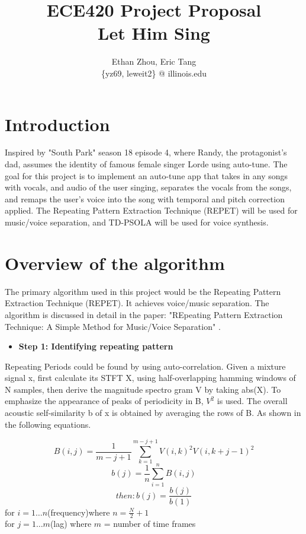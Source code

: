 \documentclass[journal,onecolumn, draftclsnofoot, 12pt]{IEEEtran}
\title{ECE420 Project Proposal\\ Let Him Sing }
\author{Ethan Zhou, Eric Tang \\
\{yz69, leweit2\} @ illinois.edu}
\begin{document}
\maketitle
\section{Introduction}
Inspired by "South Park" season 18 episode 4, where Randy, the protagonist's dad, assumes the identity of famous female singer Lorde using auto-tune. The goal for this project is to implement an auto-tune app that takes in any songs with vocals, and audio of the user singing, separates the vocals from the songs, and remaps the user's voice into the song with temporal and pitch correction applied. The Repeating Pattern Extraction Technique (REPET) will be used for music/voice separation, and TD-PSOLA will be used for voice synthesis.

\section{Overview of the algorithm}
The primary algorithm used in this project would be the Repeating Pattern Extraction Technique (REPET). It achieves voice/music separation. The algorithm is discussed in detail in the paper: "REpeating Pattern Extraction Technique: A Simple Method for Music/Voice Separation" \cite{rafii2012repeating}.

\vspace{0.5cm}
\begin{itemize}
    \item \textbf{Step 1: Identifying repeating pattern} 
\end{itemize}
\begin{description}
   Repeating Periods could be found by using auto-correlation. Given a mixture signal x, first calculate its STFT X, using half-overlapping hamming windows of N samples, then derive the magnitude spectro gram V by taking abs(X). To emphasize the appearance of peaks of periodicity in B, $V^2$ is used. The overall acoustic self-similarity b of x is obtained by averaging the rows of B. As shown in the following equations.
\end{description}



         \[B(i,j) = \frac{1}{m-j+1}\sum_{k=1}^{m-j+1} V(i,k)^2V(i,k + j - 1)^2 \]
         \[b(j)=\frac{1}{n}\sum_{i=1}^{n}B(i,j)\] \[then : b(j)=\frac{b(j)}{b(1)}\]
         for \(i= 1 \dots n\)(frequency)where \(n = \frac{N}{2} + 1\)
         \centering
         \\
         for \(j= 1 \dots m\)(lag) where \(m\) = number of time frames
         \centering
         \\
\end{document}
